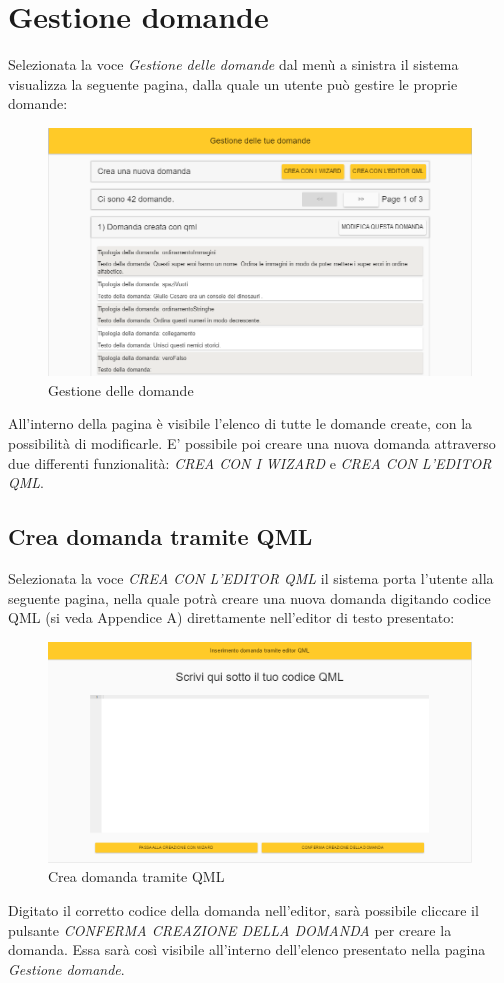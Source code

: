 \newpage
\section{Gestione domande}
Selezionata la voce \textit{Gestione delle domande} dal menù a sinistra il sistema visualizza la seguente pagina, dalla quale un utente può gestire le proprie domande:

\label{GestioneDomande}
\begin{figure}[ht]
	\centering
	\includegraphics[scale=0.45]{img/gestione_domande.png}
	\caption{Gestione delle domande}
\end{figure}
\FloatBarrier

All'interno della pagina è visibile l'elenco di tutte le domande create, con la possibilità di modificarle. E' possibile poi creare una nuova domanda attraverso due differenti funzionalità: \textit{CREA CON I WIZARD} e \textit{CREA CON L'EDITOR QML}.

\subsection{Crea domanda tramite QML}
Selezionata la voce \textit{CREA CON L'EDITOR QML} il sistema porta l'utente alla seguente pagina, nella quale potrà creare una nuova domanda digitando codice QML (si veda Appendice A) direttamente nell'editor di testo presentato:

\label{CreaDomandaQML}
\begin{figure}[ht]
	\centering
	\includegraphics[scale=0.40]{img/domanda_qml.png}
	\caption{Crea domanda tramite QML}
\end{figure}
\FloatBarrier

Digitato il corretto codice della domanda nell'editor, sarà possibile cliccare il pulsante \textit{CONFERMA CREAZIONE DELLA DOMANDA} per creare la domanda. Essa sarà così visibile all'interno dell'elenco presentato nella pagina \textit{Gestione domande}.